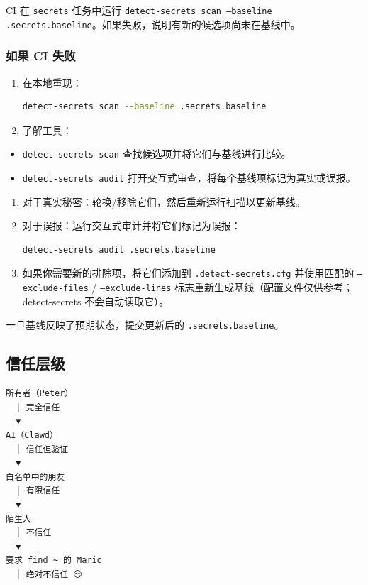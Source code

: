 CI 在 \texttt{secrets} 任务中运行 \texttt{detect-secrets scan --baseline .secrets.baseline}。如果失败，说明有新的候选项尚未在基线中。

\subsubsection{如果 CI 失败}


\begin{enumerate}
  \item 在本地重现：
\begin{lstlisting}[language=bash]
   detect-secrets scan --baseline .secrets.baseline
\end{lstlisting}

  \item 了解工具：
\end{enumerate}

\begin{itemize}
  \item \texttt{detect-secrets scan} 查找候选项并将它们与基线进行比较。
  \item \texttt{detect-secrets audit} 打开交互式审查，将每个基线项标记为真实或误报。
\end{itemize}

\begin{enumerate}
  \item 对于真实秘密：轮换/移除它们，然后重新运行扫描以更新基线。
  \item 对于误报：运行交互式审计并将它们标记为误报：
\begin{lstlisting}[language=bash]
   detect-secrets audit .secrets.baseline
\end{lstlisting}

  \item 如果你需要新的排除项，将它们添加到 \texttt{.detect-secrets.cfg} 并使用匹配的 \texttt{--exclude-files} / \texttt{--exclude-lines} 标志重新生成基线（配置文件仅供参考；detect-secrets 不会自动读取它）。
\end{enumerate}


一旦基线反映了预期状态，提交更新后的 \texttt{.secrets.baseline}。

\subsection{信任层级}


\begin{lstlisting}
所有者（Peter）
  │ 完全信任
  ▼
AI（Clawd）
  │ 信任但验证
  ▼
白名单中的朋友
  │ 有限信任
  ▼
陌生人
  │ 不信任
  ▼
要求 find ~ 的 Mario
  │ 绝对不信任 😏
\end{lstlisting}


